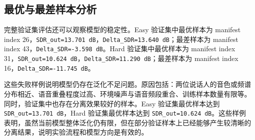 \subsection{最优与最差样本分析}

完整验证集评估还可以观察模型的稳定性。Easy 验证集中最优样本为 manifest index 26，\texttt{SDR\_out=13.701 dB}，\texttt{Delta\_SDR=13.640 dB}；最差样本为 manifest index 43，\texttt{Delta\_SDR=-3.598 dB}。Hard 验证集中最优样本为 manifest index 31，\texttt{SDR\_out=10.624 dB}，\texttt{Delta\_SDR=11.290 dB}；最差样本为 manifest index 16，\texttt{Delta\_SDR=-11.745 dB}。

这些失败样例说明模型仍存在泛化不足问题。原因包括：两位说话人的音色或频谱分布相近、语音重叠程度过高、环境噪声与语音频段重合、训练样本数量有限等。同时，验证集中也存在分离效果较好的样本。Easy 验证集最优样本达到 \texttt{SDR\_out=13.701 dB}，Hard 验证集最优样本达到 \texttt{SDR\_out=10.624 dB}。这些样例表明，虽然当前模型整体泛化仍有限，但在部分验证样本上已经能够产生较清晰的分离结果，说明实验流程和模型方向是有效的。
